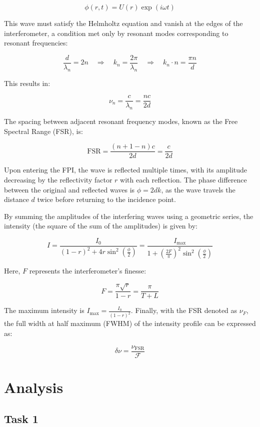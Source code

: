 \documentclass{article}
\begin{document}
\[
\phi(r, t) = U(r)\exp(i\omega t)
\]

This wave must satisfy the Helmholtz equation and vanish at the edges of the interferometer, a condition met only by resonant modes corresponding to resonant frequencies:

\[
\frac{d}{\lambda_n} = 2n \quad \Rightarrow \quad k_n = \frac{2\pi}{\lambda_n} \quad \Rightarrow \quad k_n \cdot n = \frac{\pi n}{d}
\]

This results in:

\[
\nu_n = \frac{c}{\lambda_n} = \frac{nc}{2d}
\]

The spacing between adjacent resonant frequency modes, known as the Free Spectral Range (FSR), is:

\[
\text{FSR} = \frac{(n+1-n)c}{2d} = \frac{c}{2d}
\]

Upon entering the FPI, the wave is reflected multiple times, with its amplitude decreasing by the reflectivity factor \(r\) with each reflection. The phase difference between the original and reflected waves is \(\phi = 2dk\), as the wave travels the distance \(d\) twice before returning to the incidence point.

By summing the amplitudes of the interfering waves using a geometric series, the intensity (the square of the sum of the amplitudes) is given by:

\[
I = \frac{I_0}{(1-r)^2 + 4r \sin^2\left(\frac{\phi}{2}\right)} = \frac{I_{\text{max}}}{1 + \left(\frac{2F}{\pi}\right)^2 \sin^2\left(\frac{\phi}{2}\right)}
\]

Here, \(F\) represents the interferometer's finesse:

\[
F = \frac{\pi\sqrt{r}}{1-r} = \frac{\pi}{T + L}
\]

The maximum intensity is \(I_{\text{max}} = \frac{I_0}{(1-r)^2}\). Finally, with the FSR denoted as \(\nu_F\), the full width at half maximum (FWHM) of the intensity profile can be expressed as:


\begin{equation}
	\delta \nu = \frac{\nu_{\text{FSR}}}{\mathscr{F}}
	\label{eq:finesse}
\end{equation}

\pagebreak{}

\section{Analysis}

\subsection{Task 1}
\end{document}
